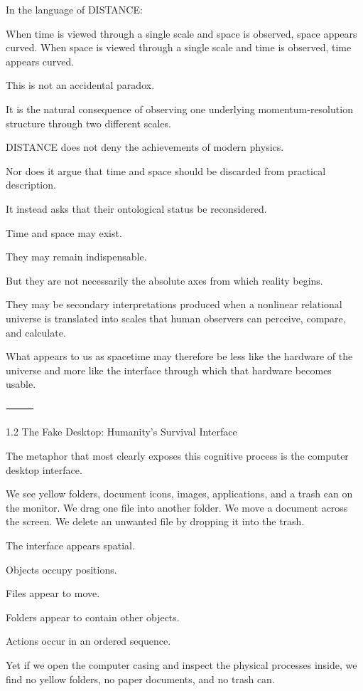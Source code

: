 In the language of DISTANCE:

When time is viewed through a single scale and space is observed, space appears curved. When space is viewed through a single scale and time is observed, time appears curved.

This is not an accidental paradox.

It is the natural consequence of observing one underlying momentum-resolution structure through two different scales.

DISTANCE does not deny the achievements of modern physics.

Nor does it argue that time and space should be discarded from practical description.

It instead asks that their ontological status be reconsidered.

Time and space may exist.

They may remain indispensable.

But they are not necessarily the absolute axes from which reality begins.

They may be secondary interpretations produced when a nonlinear relational universe is translated into scales that human observers can perceive, compare, and calculate.

What appears to us as spacetime may therefore be less like the hardware of the universe and more like the interface through which that hardware becomes usable.

⸻

1.2 The Fake Desktop: Humanity’s Survival Interface

The metaphor that most clearly exposes this cognitive process is the computer desktop interface.

We see yellow folders, document icons, images, applications, and a trash can on the monitor. We drag one file into another folder. We move a document across the screen. We delete an unwanted file by dropping it into the trash.

The interface appears spatial.

Objects occupy positions.

Files appear to move.

Folders appear to contain other objects.

Actions occur in an ordered sequence.

Yet if we open the computer casing and inspect the physical processes inside, we find no yellow folders, no paper documents, and no trash can.

